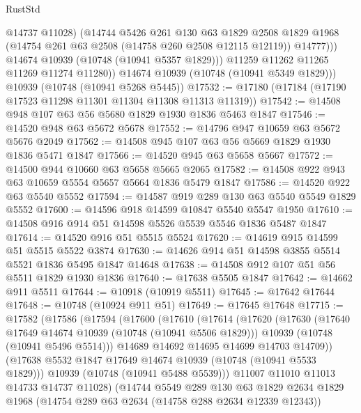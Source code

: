 \begin{lexlean}{RustStd}
\begin{coremodule}
                  @14737
                  @11028)
                (@14744
                  @5426
                  @261
                  @130
                  @63
                  @1829
                  @2508
                  @1829
                  @1968
                  (@14754 @261 @63 @2508 (@14758 @260 @2508 @12115 @12119))
                  @14777)))
            @14674
            @10939
            (@10748 (@10941 @5357 @1829)))
          @11259
          @11262
          @11265
          @11269
          @11274
          @11280))
      @14674
      @10939
      (@10748 (@10941 @5349 @1829)))
    @10939
    (@10748 (@10941 @5268 @5445))
@17532 := @17180 (@17184 (@17190 @17523 @11298 @11301 @11304 @11308 @11313 @11319))
@17542 := @14508 @948 @107 @63 @56 @5680 @1829 @1930 @1836 @5463 @1847
@17546 := @14520 @948 @63 @5672 @5678
@17552 := @14796 @947 @10659 @63 @5672 @5676 @2049
@17562 := @14508 @945 @107 @63 @56 @5669 @1829 @1930 @1836 @5471 @1847
@17566 := @14520 @945 @63 @5658 @5667
@17572 := @14500 @944 @10660 @63 @5658 @5665 @2065
@17582 := @14508 @922 @943 @63 @10659 @5554 @5657 @5664 @1836 @5479 @1847
@17586 := @14520 @922 @63 @5540 @5552
@17594 := @14587 @919 @289 @130 @63 @5540 @5549 @1829 @5552
@17600 := @14596 @918 @14599 @10847 @5540 @5547 @1950
@17610 := @14508 @916 @914 @51 @14598 @5526 @5539 @5546 @1836 @5487 @1847
@17614 := @14520 @916 @51 @5515 @5524
@17620 := @14619 @915 @14599 @51 @5515 @5522 @3874
@17630 := @14626 @914 @51 @14598 @3855 @5514 @5521 @1836 @5495 @1847 @14648
@17638 := @14508 @912 @107 @51 @56 @5511 @1829 @1930 @1836
@17640 := @17638 @5505 @1847
@17642 := @14662 @911 @5511
@17644 := @10918 (@10919 @5511)
@17645 := @17642 @17644
@17648 := @10748 (@10924 @911 @51)
@17649 := @17645 @17648
@17715 := @17582
    (@17586
      (@17594
        (@17600
          (@17610
            (@17614
              (@17620
                (@17630
                  (@17640 @17649 @14674 @10939 (@10748 (@10941 @5506 @1829)))
                  @10939
                  (@10748 (@10941 @5496 @5514)))
                @14689
                @14692
                @14695
                @14699
                @14703
                @14709))
            (@17638 @5532 @1847 @17649 @14674 @10939 (@10748 (@10941 @5533 @1829)))
            @10939
            (@10748 (@10941 @5488 @5539)))
          @11007
          @11010
          @11013
          @14733
          @14737
          @11028)
        (@14744
          @5549
          @289
          @130
          @63
          @1829
          @2634
          @1829
          @1968
          (@14754 @289 @63 @2634 (@14758 @288 @2634 @12339 @12343))

\end{coremodule}
\end{lexlean}
